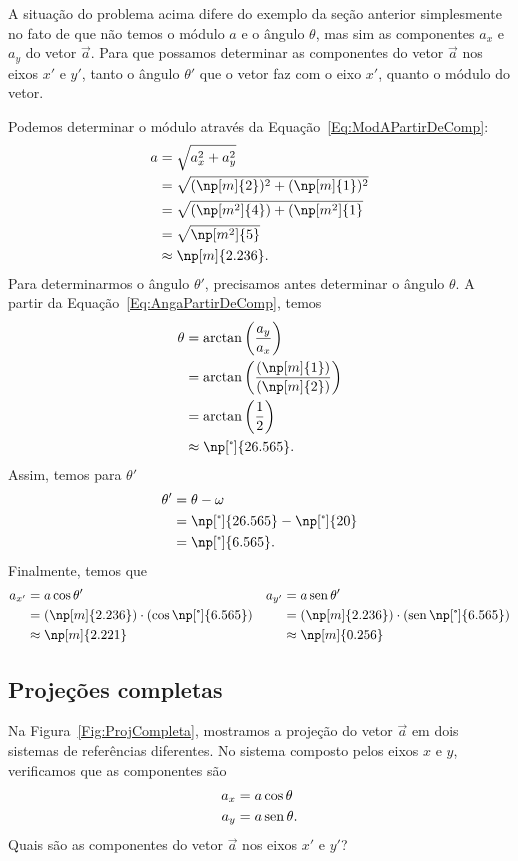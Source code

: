 A situação do problema acima difere do exemplo da seção anterior simplesmente no fato de que não temos o módulo $a$ e o ângulo $\theta$, mas sim as componentes $a_x$ e $a_y$ do vetor $\vec{a}$. 
Para que possamos determinar as componentes do vetor $\vec{a}$ nos eixos $x'$ e $y'$, tanto o ângulo $\theta'$ que o vetor faz com o eixo $x'$, quanto o módulo do vetor.

Podemos determinar o módulo através da Equação~\eqref{Eq:ModAPartirDeComp}:
\begin{align}
    a &= \sqrt{a_x^2 + a_y^2} \\
    &= \sqrt{(\np[m]{2})^2 + (\np[m]{1})^2} \\
    &= \sqrt{(\np[m^2]{4}) + (\np[m^2]{1}} \\
    &= \sqrt{\np[m^2]{5}} \\
    &\approx \np[m]{2.236}.
\end{align}
%
Para determinarmos o ângulo $\theta'$, precisamos antes determinar o ângulo $\theta$. A partir da Equação~\eqref{Eq:AngaPartirDeComp}, temos
\begin{align}
    \theta &= \arctan\left(\frac{a_y}{a_x}\right) \\
    &= \arctan\left(\frac{(\np[m]{1})}{(\np[m]{2})}\right) \\
    &=\arctan\left(\frac{1}{2}\right) \\
    &\approx \np[\tcdegree]{26.565}.
\end{align}
%
Assim, temos para $\theta'$
\begin{align}
    \theta' &= \theta - \omega \\
    &= \np[\tcdegree]{26.565} - \np[\tcdegree]{20} \\
    &= \np[\tcdegree]{6.565}.
\end{align}
%
Finalmente, temos que
\begin{align}
    a_{x'} &= a\cos\theta' & a_{y'} &= a\sen\theta' \\
    &= (\np[m]{2.236})\cdot(\cos\np[\tcdegree]{6.565}) & &= (\np[m]{2.236})\cdot(\sen\np[\tcdegree]{6.565}) \\
    &\approx \np[m]{2.221} & &\approx \np[m]{0.256}
\end{align}

\subsection{Projeções completas}

Na Figura~\ref{Fig:ProjCompleta}, mostramos a projeção do vetor $\vec{a}$ em dois sistemas de referências diferentes. No sistema composto pelos eixos $x$ e $y$, verificamos que as componentes são
\begin{align}
    a_x &= a \cos\theta \\
    a_y &= a \operatorname{sen}\theta.
\end{align}
%
Quais são as componentes do vetor $\vec{a}$ nos eixos $x'$ e $y'$?

